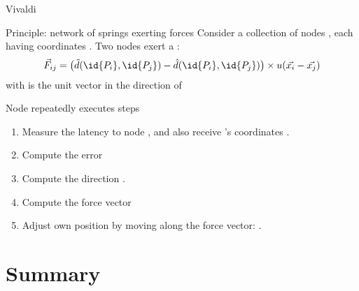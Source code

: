 \begin{slide}{Vivaldi}
  \begin{block}{Principle: network of springs exerting forces}
    Consider a collection of  nodes , each  having
    coordinates . Two nodes exert a :
    \[
    \vec{F}_{ij} = \big(\tilde{d}(\id{P_i},\id{P_j}) - \hat{d}(\id{P_i},\id{P_j})\big) \times
    u(\vec{x_i}-\vec{x_j})
    \]
    with  is the unit vector in the direction of 
  \end{block}
  \begin{block}{Node  repeatedly executes steps}
    \begin{enumerate}\tightlist
    \item Measure the latency  to node , and also receive 's coordinates
      . 
    \item Compute the error 
    \item Compute the direction .
    \item Compute the force vector 
    \item Adjust own position by moving along the force vector: .
    \end{enumerate}
  \end{block}
\end{slide}
\section{Summary}
